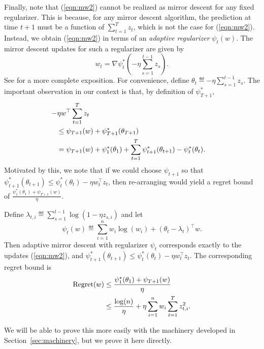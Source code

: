 \documentclass[paper_icml.tex]{subfiles}
\begin{document}
Finally, note that (\ref{eqn:mw2}) cannot be realized as mirror descent for any 
fixed regularizer. This is because, for any mirror descent algorithm, the 
prediction at time $t+1$ must be a function of $\sum_{t=1}^T z_t$, which is 
not the case for (\ref{eqn:mw2}). Instead, we obtain (\ref{eqn:mw2}) in terms of 
an \emph{adaptive regularizer} $\psi_t(w)$. The mirror descent updates for 
such a regularizer are given by 
\[ w_{t} = \nabla \psi_t^*\left(-\eta \sum_{s=1}^{t-1} z_s\right). \]
See \cite{orabona2013general} for a more complete exposition. For convenience, 
define $\theta_t \eqdef -\eta \sum_{s=1}^{t-1} z_s$. The important 
observation in our context is that, by definition of $\psi_{T+1}^*$, 
\begin{align}
\label{eqn:telescope}
\lefteqn{\hskip -0.1in - \eta w^{\top} \sum_{t=1}^T z_t} \\
\nonumber \hskip 0.1in &\leq \psi_{T+1}(w) + \psi_{T+1}^*(\theta_{T+1}) \\
\nonumber &= \psi_{T+1}(w) + \psi_1^*(\theta_1) + \sum_{t=1}^T \psi_{t+1}^*(\theta_{t+1}) - \psi_t^*(\theta_t). 
\end{align}
Motivated by this, we note that if we could choose $\psi_{t+1}$ so that 
$\psi_{t+1}^*(\theta_{t+1}) \leq \psi_{t}^*(\theta_t) - \eta w_t^{\top}z_t$, 
then re-arranging would yield a regret bound of $\frac{\psi_1^*(\theta_1) + \psi_{T+1}(w)}{\eta}$.
\begin{proposition}
\label{prop:correspondence}
Define $\lambda_{t,i} \eqdef \sum_{s=1}^{t-1} \log(1-\eta z_{s,i})$ and let
\[ \psi_t(w) \eqdef \sum_{i=1}^n w_i\log(w_i) + (\theta_t - \lambda_t)^{\top}w. \]
Then adaptive mirror descent with regularizer $\psi_t$ corresponds exactly to 
the updates (\ref{eqn:mw2}), and 
$\psi_{t+1}^*(\theta_{t+1}) \leq \psi_t^*(\theta_t) - \eta w_t^{\top}z_t$. 
The corresponding regret bound is
\begin{align}
\operatorname{Regret}(w) &\leq \frac{\psi_1^*(\theta_1) + \psi_{T+1}(w)}{\eta} \\
 &\leq \frac{\log(n)}{\eta} + \eta \sum_{i=1}^n w_i \sum_{t=1}^T z_{t,i}^2.
\end{align}
\end{proposition}
We will be able to prove this more easily with the machinery developed in 
Section~\ref{sec:machinery}, but we prove it here directly.
\end{document}

